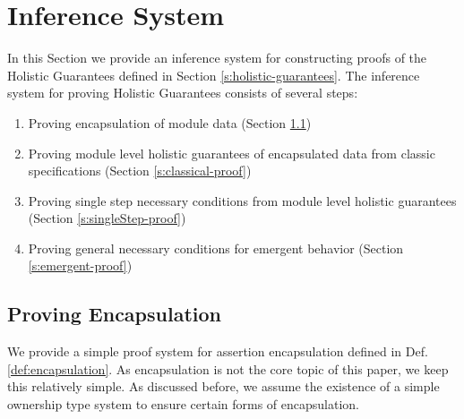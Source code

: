 \section{Inference System}  
\label{s:inference}

In this Section we provide an inference system for constructing 
proofs of the Holistic Guarantees defined in Section \ref{s:holistic-guarantees}.
The inference system for proving Holistic Guarantees consists of several steps:
\begin{enumerate}
\item
Proving encapsulation of module data (Section \ref{s:encap-proof})
\item
Proving module level holistic guarantees of encapsulated data from classic specifications (Section \ref{s:classical-proof})
\item
Proving single step necessary conditions from module level holistic guarantees (Section \ref{s:singleStep-proof})
\item
Proving general necessary conditions for emergent behavior (Section \ref{s:emergent-proof})
\end{enumerate}

\subsection{Proving Encapsulation}
\label{s:encap-proof}

We provide a simple proof system for assertion encapsulation defined in Def. \ref{def:encapsulation}. As encapsulation is not the core topic of this paper, we keep this
relatively simple. As discussed before, we assume the existence of a simple ownership type system to ensure certain forms of encapsulation.

